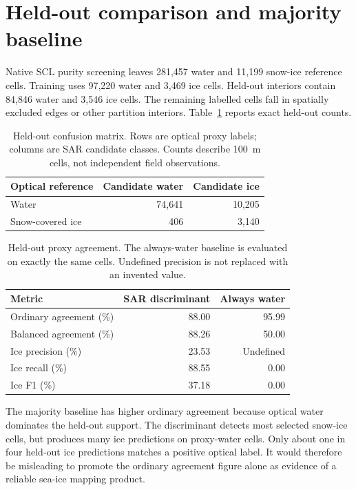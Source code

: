 \section{Held-out comparison and majority baseline}

Native SCL purity screening leaves 281,457 water and 11,199 snow-ice reference cells.
Training uses 97,220 water and 3,469 ice cells. Held-out interiors contain 84,846 water
and 3,546 ice cells. The remaining labelled cells fall in spatially excluded edges or
other partition interiors. Table~\ref{tab:confusion} reports exact held-out counts.

\begin{table}[htbp]
\centering
\caption{Held-out confusion matrix. Rows are optical proxy labels; columns are SAR
candidate classes. Counts describe 100~m cells, not independent field observations.}
\label{tab:confusion}
\begin{tabular}{lrr}
\toprule
Optical reference & Candidate water & Candidate ice\\
\midrule
Water & 74,641 & 10,205\\
Snow-covered ice & 406 & 3,140\\
\bottomrule
\end{tabular}
\end{table}

\begin{table}[htbp]
\centering
\caption{Held-out proxy agreement. The always-water baseline is evaluated on exactly
the same cells. Undefined precision is not replaced with an invented value.}
\label{tab:agreement-metrics}
\begin{tabular}{lrr}
\toprule
Metric & SAR discriminant & Always water\\
\midrule
Ordinary agreement (\%) & 88.00 & 95.99\\
Balanced agreement (\%) & 88.26 & 50.00\\
Ice precision (\%) & 23.53 & Undefined\\
Ice recall (\%) & 88.55 & 0.00\\
Ice F1 (\%) & 37.18 & 0.00\\
\bottomrule
\end{tabular}
\end{table}

The majority baseline has higher ordinary agreement because optical water dominates
the held-out support. The discriminant detects most selected snow-ice cells, but produces
many ice predictions on proxy-water cells. Only about one in four held-out ice predictions
matches a positive optical label. It would therefore be misleading to promote the ordinary
agreement figure alone as evidence of a reliable sea-ice mapping product.

